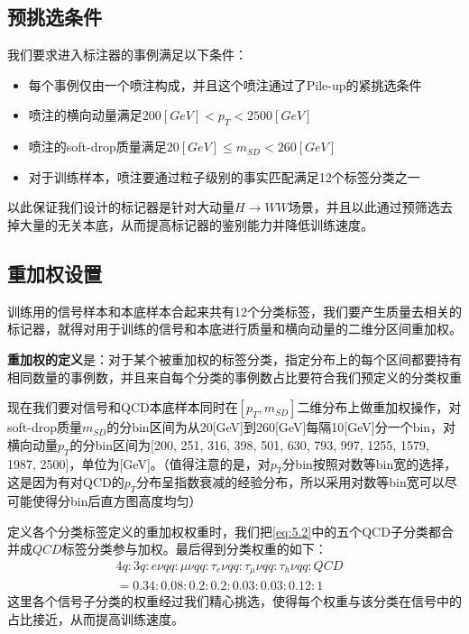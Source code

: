 \subsection{预挑选条件}
我们要求进入标注器的事例满足以下条件：
\begin{itemize}
    \item 每个事例仅由一个喷注构成，并且这个喷注通过了Pile-up的紧挑选条件
    \item 喷注的横向动量满足$200[\si{GeV}]<p_T<2500[\si{GeV}]$
    \item 喷注的soft-drop质量满足$20[\si{GeV}]\leq m_{SD}<260[\si{GeV}]$
    \item 对于训练样本，喷注要通过粒子级别的事实匹配满足12个标签分类之一
\end{itemize}
以此保证我们设计的标记器是针对大动量$H\to WW$场景，并且以此通过预筛选去掉大量的无关本底，从而提高标记器的鉴别能力并降低训练速度。

\subsection{重加权设置}
训练用的信号样本和本底样本合起来共有12个分类标签，我们要产生质量去相关的标记器，就得对用于训练的信号和本底进行质量和横向动量的二维分区间重加权。

\textbf{重加权的定义}是：对于某个被重加权的标签分类，指定分布上的每个区间都要持有相同数量的事例数，并且来自每个分类的事例数占比要符合我们预定义的分类权重

现在我们要对信号和QCD本底样本同时在$[p_T,m_{SD}]$二维分布上做重加权操作，对soft-drop质量$m_{SD}$的分bin区间为从20[GeV]到260[GeV]每隔10[GeV]分一个bin，对横向动量$p_T$的分bin区间为[200, 251, 316, 398, 501, 630, 793, 997, 1255, 1579, 1987, 2500]，单位为[GeV]。（值得注意的是，对$p_T$分bin按照对数等bin宽的选择，这是因为有对QCD的$p_T$分布呈指数衰减的经验分布，所以采用对数等bin宽可以尽可能使得分bin后直方图高度均匀）

定义各个分类标签定义的重加权权重时，我们把\eqref{eq:5.2}中的五个QCD子分类都合并成$QCD$标签分类参与加权。最后得到分类权重的如下：
\begin{equation}
\begin{split}
    4q:3q:e\nu qq:\mu\nu qq:\tau_e\nu qq:\tau_\mu\nu qq:\tau_h\nu qq:QCD \\
    =0.34:0.08:0.2:0.2:0.03:0.03:0.12:1 &
\end{split}
\end{equation}
这里各个信号子分类的权重经过我们精心挑选，使得每个权重与该分类在信号中的占比接近，从而提高训练速度。

